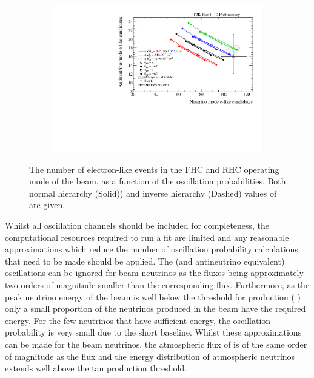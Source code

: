 \begin{figure}[h]
  \begin{subfigure}[t]{0.65\textwidth}
    \includegraphics[width=\textwidth, trim={0mm 0mm 0mm 0mm}, clip,page=1]{Figures/Oscillation/BiProbabilityPlot.pdf}
  \end{subfigure}
  \caption{The number of electron-like events in the FHC and RHC operating mode of the beam, as a function of the oscillation probabilities. Both normal hierarchy (Solid)) and inverse hierarchy (Dashed) values of \delmsqatm are given.}
  \label{fig:Oscillation_SK_BiProbabilityPlot}
\end{figure}

Whilst all oscillation channels should be included for completeness, the computational resources required to run a fit are limited and any reasonable approximations which reduce the number of oscillation probability calculations that need to be made should be applied. The  (and antineutrino equivalent) oscillations can be ignored for beam neutrinos as the  fluxes being approximately two orders of magnitude smaller than the corresponding \quickmath{\nu_{\mu}/\bar{\nu}_{\mu}} flux. Furthermore, as the peak neutrino energy of the beam is well below the threshold for \quickmath{\tau} production ( \cite{Machado2020}) only a small proportion of the neutrinos produced in the beam have the required energy. For the few neutrinos that have sufficient energy, the oscillation probability is very small due to the short baseline. Whilst these approximations can be made for the beam neutrinos, the atmospheric flux of  is of the same order of magnitude as the \quickmath{\nu_{\mu}} flux and the energy distribution of atmospheric neutrinos extends well above the tau production threshold.

